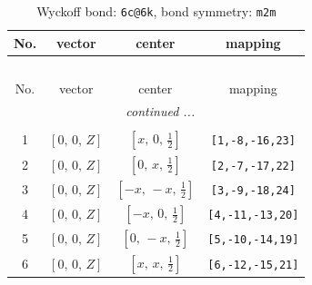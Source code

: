 \documentclass[fleqn,8pt]{jsarticle}
\begin{document}
\begin{longtable}{cccc}
\caption{Wyckoff bond: {\tt 6c@6k}, bond symmetry: {\tt m2m}}
 \\
 \hline \hline
No. & vector & center & mapping \\ \hline \endfirsthead

\multicolumn{3}{l}{\tablename\ \thetable{}} \\
 \hline \hline
No. & vector & center & mapping \\ \hline \endhead

 \hline \hline
\multicolumn{3}{r}{\footnotesize\it continued ...} \\ \endfoot

 \hline \hline
\multicolumn{3}{r}{} \\ \endlastfoot

1 & $\left[ 0,\, 0,\, Z \right]$ & $\left[ x,\, 0,\, \frac{1}{2} \right]$ & {\tt [1,-8,-16,23]} \\ \hline
2 & $\left[ 0,\, 0,\, Z \right]$ & $\left[ 0,\, x,\, \frac{1}{2} \right]$ & {\tt [2,-7,-17,22]} \\ \hline
3 & $\left[ 0,\, 0,\, Z \right]$ & $\left[ - x,\, - x,\, \frac{1}{2} \right]$ & {\tt [3,-9,-18,24]} \\ \hline
4 & $\left[ 0,\, 0,\, Z \right]$ & $\left[ - x,\, 0,\, \frac{1}{2} \right]$ & {\tt [4,-11,-13,20]} \\ \hline
5 & $\left[ 0,\, 0,\, Z \right]$ & $\left[ 0,\, - x,\, \frac{1}{2} \right]$ & {\tt [5,-10,-14,19]} \\ \hline
6 & $\left[ 0,\, 0,\, Z \right]$ & $\left[ x,\, x,\, \frac{1}{2} \right]$ & {\tt [6,-12,-15,21]} \\
\end{longtable}
\renewcommand{\arraystretch}{1.2}
\end{document}
